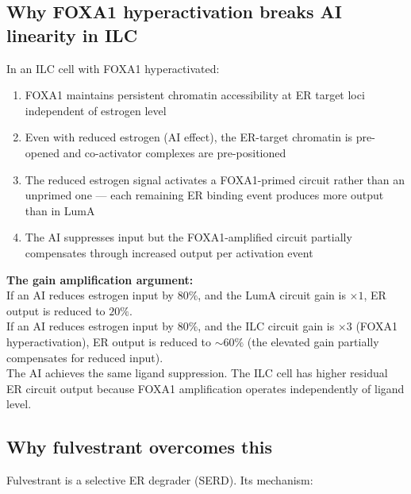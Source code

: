 \documentclass[12pt, a4paper]{article}
\begin{document}
\subsection{Why FOXA1 hyperactivation breaks
AI linearity in ILC}

In an ILC cell with FOXA1 hyperactivated:

\begin{enumerate}
    \item FOXA1 maintains persistent chromatin
    accessibility at ER target loci independent
    of estrogen level
    \item Even with reduced estrogen (AI effect),
    the ER-target chromatin is pre-opened and
    co-activator complexes are pre-positioned
    \item The reduced estrogen signal activates
    a FOXA1-primed circuit rather than an
    unprimed one --- each remaining ER binding
    event produces more output than in LumA
    \item The AI suppresses input but the
    FOXA1-amplified circuit partially compensates
    through increased output per activation event
\end{enumerate}

\begin{center}
\colorbox{mechanismbox}{
\begin{minipage}{0.88\textwidth}
\vspace{0.5em}
\textbf{The gain amplification argument:}\\[0.4em]
If an AI reduces estrogen input by $80\%$, and
the LumA circuit gain is $\times1$, ER output
is reduced to $20\%$.\\[0.3em]
If an AI reduces estrogen input by $80\%$, and
the ILC circuit gain is $\times3$ (FOXA1
hyperactivation), ER output is reduced to
${\sim}60\%$ (the elevated gain partially
compensates for reduced input).\\[0.3em]
The AI achieves the same ligand suppression.
The ILC cell has higher residual ER circuit
output because FOXA1 amplification operates
independently of ligand level.
\vspace{0.5em}
\end{minipage}}
\end{center}

\subsection{Why fulvestrant overcomes this}

Fulvestrant is a selective ER degrader (SERD).
Its mechanism:
\end{document}
